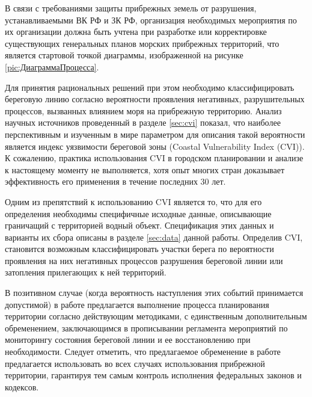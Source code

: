 В связи с требованиями защиты прибрежных земель от разрушения, устанавливаемыми ВК РФ и ЗК РФ, организация необходимых мероприятия по их организации должна быть учтена при разработке или корректировке существующих генеральных планов морских прибрежных территорий, что является стартовой точкой диаграммы, изображенной на рисунке \ref{pic:ДиаграммаПроцесса}. 


Для принятия рациональных решений при этом необходимо классифицировать береговую линию согласно вероятности проявления негативных, разрушительных процессов, вызванных влиянием моря на прибрежную территорию. 
Анализ научных источников проведенный в разделе \ref{sec:cvi} показал, что наиболее перспективным и изученным в мире параметром для описания такой вероятности является индекс уязвимости береговой зоны (Coastal Vulnerability Index (CVI)).
К сожалению, практика использования CVI в городском планировании и анализе к настоящему моменту не выполняется, хотя опыт многих стран доказывает эффективность его применения в течение последних 30 лет.

Одним из препятствий к использованию CVI является то, что для его определения необходимы специфичные исходные данные, описывающие граничащий с территорией водный объект.
Спецификация этих данных и варианты их сбора описаны в разделе \ref{sec:data} данной работы.
Определив CVI, становится возможным классифицировать участки берега по вероятности проявления на них негативных процессов разрушения береговой линии или затопления прилегающих к ней территорий.

В позитивном случае (когда вероятность наступления этих событий принимается допустимой) в работе предлагается выполнение процесса планирования территории согласно действующим методиками, с единственным дополнительным обременением, заключающимся в прописывании регламента мероприятий по мониторингу состояния береговой линии и ее восстановлению при необходимости.
Следует отметить, что предлагаемое обременение в работе предлагается использовать во всех случаях использования прибрежной территории, гарантируя тем самым контроль исполнения федеральных законов и кодексов.

